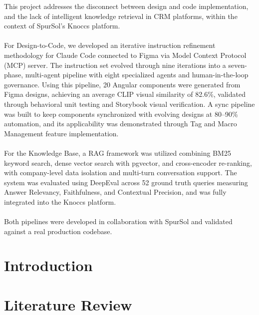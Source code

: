 \documentclass[12pt,twosided]{report}
\begin{document}
This project addresses the disconnect between design and code implementation, and the lack of intelligent knowledge retrieval in CRM platforms, within the context of SpurSol's Knoccs platform.
\\\\
For Design-to-Code, we developed an iterative instruction refinement methodology for Claude Code connected to Figma via Model Context Protocol (MCP) server. The instruction set evolved through nine iterations into a seven-phase, multi-agent pipeline with eight specialized agents and human-in-the-loop governance. Using this pipeline, 20 Angular components were generated from Figma designs, achieving an average CLIP visual similarity of 82.6\%, validated through behavioral unit testing and Storybook visual verification. A sync pipeline was built to keep components synchronized with evolving designs at 80--90\% automation, and its applicability was demonstrated through Tag and Macro Management feature implementation.
\\\\
For the Knowledge Base, a RAG framework was utilized combining BM25 keyword search, dense vector search with pgvector, and cross-encoder re-ranking, with company-level data isolation and multi-turn conversation support. The system was evaluated using DeepEval across 52 ground truth queries measuring Answer Relevancy, Faithfulness, and Contextual Precision, and was fully integrated into the Knoccs platform.
\\\\
Both pipelines were developed in collaboration with SpurSol and validated against a real production codebase.

\tableofcontents
\listoffigures
\listoftables

\chapter{Introduction}
\label{chap:intro}


\chapter{Literature Review}
\label{chap:lit}

\end{document}
